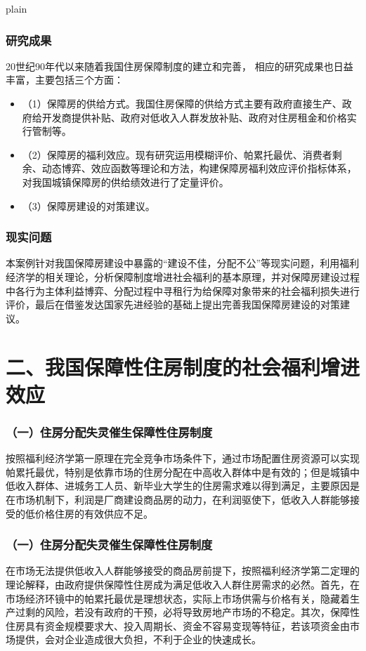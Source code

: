 \documentclass[aspectratio=169, 12pt]{beamer}
\begin{document}
\begin{frame}{plain}
    \frametitle{研究成果}
    20世纪90年代以来随着我国住房保障制度的建立和完善，
    相应的研究成果也日益丰富，主要包括三个方面：
    \begin{itemize}
        \item （1）保障房的供给方式。我国住房保障的供给方式主要有政府直接生产、政府给开发商提供补贴、政府对低收入人群发放补贴、政府对住房租金和价格实行管制等。
        \item （2）保障房的福利效应。现有研究运用模糊评价、帕累托最优、消费者剩余、动态博弈、效应函数等理论和方法，构建保障房福利效应评价指标体系，对我国城镇保障房的供给绩效进行了定量评价。
        \item （3）保障房建设的对策建议。
    \end{itemize}
\end{frame}

\begin{frame}[plain]
    \frametitle{现实问题}
    本案例针对我国保障房建设中暴露的“建设不佳，分配不公”等现实问题，利用福利经济学的相关理论，分析保障制度增进社会福利的基本原理，并对保障房建设过程中各行为主体利益博弈、分配过程中寻租行为给保障对象带来的社会福利损失进行评价，最后在借鉴发达国家先进经验的基础上提出完善我国保障房建设的对策建议。
\end{frame}

\section{二、我国保障性住房制度的社会福利增进效应}

\begin{frame}[plain]
    \frametitle{（一）住房分配失灵催生保障性住房制度}
    按照福利经济学第一原理在完全竞争市场条件下，通过市场配置住房资源可以实现帕累托最优，特别是依靠市场的住房分配在中高收入群体中是有效的；但是城镇中低收入群体、进城务工人员、新毕业大学生的住房需求难以得到满足，主要原因是在市场机制下，利润是厂商建设商品房的动力，在利润驱使下，低收入人群能够接受的低价格住房的有效供应不足。
\end{frame}

\begin{frame}[plain]
    \frametitle{（一）住房分配失灵催生保障性住房制度}
    在市场无法提供低收入人群能够接受的商品房前提下，按照福利经济学第二定理的理论解释，由政府提供保障性住房成为满足低收入人群住房需求的必然。首先，在市场经济环镜中的帕累托最优是理想状态，实际上市场供需与价格有关，隐藏着生产过剩的风险，若没有政府的干预，必将导致房地产市场的不稳定。其次，保障性住房具有资金规模要求大、投入周期长、资金不容易变现等特征，若该项资金由市场提供，会对企业造成很大负担，不利于企业的快速成长。
\end{frame}
\end{document}
